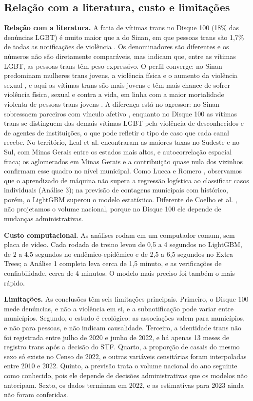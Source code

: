 \documentclass[12pt]{article}
\begin{document}
\subsection{Relação com a literatura, custo e limitações}

\textbf{Relação com a literatura.} A fatia de vítimas trans no Disque 100 (18\% das denúncias LGBT) é muito maior que a do Sinan, em que pessoas trans são 1,7\% de todas as notificações de violência \cite{marinho_tomazelli_firianelli:2024}. Os denominadores são diferentes e os números não são diretamente comparáveis, mas indicam que, entre as vítimas LGBT, as pessoas trans têm peso expressivo. O perfil converge: no Sinan predominam mulheres trans jovens, a violência física e o aumento da violência sexual \cite{leal_silva_lizzi:2026,marinho_tomazelli_firianelli:2024}, e aqui as vítimas trans são mais jovens e têm mais chance de sofrer violência física, sexual e contra a vida, em linha com a maior mortalidade violenta de pessoas trans jovens \cite{luis:2025}. A diferença está no agressor: no Sinan sobressaem parceiros com vínculo afetivo \cite{marinho_tomazelli_firianelli:2024}, enquanto no Disque 100 as vítimas trans se distinguem das demais vítimas LGBT pela violência de desconhecidos e de agentes de instituições, o que pode refletir o tipo de caso que cada canal recebe. No território, Leal et al. \cite{leal_silva_lizzi:2026} encontraram as maiores taxas no Sudeste e no Sul, com Minas Gerais entre os estados mais altos, e autocorrelação espacial fraca; os aglomerados em Minas Gerais e a contribuição quase nula dos vizinhos confirmam esse quadro no nível municipal. Como Lucca e Romero \cite{lucca_romero_sbbd:2026}, observamos que o aprendizado de máquina não supera a regressão logística ao classificar casos individuais (Análise 3); na previsão de contagens municipais com histórico, porém, o LightGBM superou o modelo estatístico. Diferente de Coelho et al. \cite{coelho_jiv:2025}, não projetamos o volume nacional, porque no Disque 100 ele depende de mudanças administrativas.

\textbf{Custo computacional.} As análises rodam em um computador comum, sem placa de vídeo. Cada rodada de treino levou de 0,5 a 4 segundos no LightGBM, de 2 a 4,5 segundos no endêmico-epidêmico e de 2,5 a 6,5 segundos no Extra Trees; a Análise 1 completa leva cerca de 1,5 minuto, e as verificações de confiabilidade, cerca de 4 minutos. O modelo mais preciso foi também o mais rápido.

\textbf{Limitações.} As conclusões têm seis limitações principais. Primeiro, o Disque 100 mede denúncias, e não a violência em si, e a subnotificação pode variar entre municípios. Segundo, o estudo é ecológico: as associações valem para municípios, e não para pessoas, e não indicam causalidade. Terceiro, a identidade trans não foi registrada entre julho de 2020 e junho de 2022, e há apenas 13 meses de registro trans após a decisão do STF. Quarto, a proporção de casais do mesmo sexo só existe no Censo de 2022, e outras variáveis censitárias foram interpoladas entre 2010 e 2022. Quinto, a previsão trata o volume nacional do ano seguinte como conhecido, pois ele depende de decisões administrativas que os modelos não antecipam. Sexto, os dados terminam em 2022, e as estimativas para 2023 ainda não foram conferidas.
\end{document}
